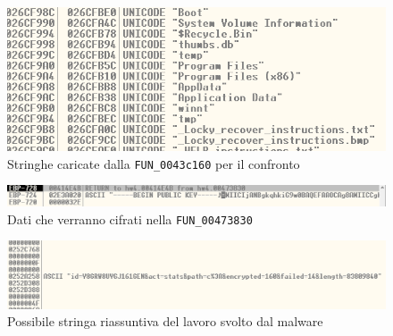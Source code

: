 \documentclass[12pt]{extarticle}
\begin{document}
\newpage
\begin{figure}[!h]
    \includegraphics[scale=0.5]{immagini/t2_strings.png}
    \caption{Stringhe caricate dalla \texttt{FUN\_0043c160} per il confronto}
    \label{figura1}
\end{figure}

\vspace{3cm}

\begin{figure}[!h]
    \includegraphics[scale=0.5]{immagini/encr.png}
    \caption{Dati che verranno cifrati nella \texttt{FUN\_00473830}}
    \label{figura2}
\end{figure}

\vspace{3cm}

\begin{figure}[!h]
    \includegraphics[scale=0.5]{immagini/final_string.png}
    \caption{Possibile stringa riassuntiva del lavoro svolto dal malware}
    \label{figura3}
\end{figure}
\end{document}
